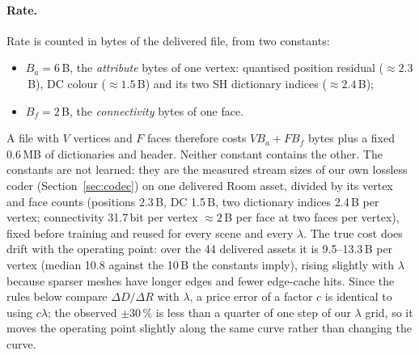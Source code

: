\documentclass[11pt,a4paper]{article}
\begin{document}
\paragraph{Rate.} Rate is counted in bytes of the delivered file, from two constants:
\begin{itemize}[nosep,leftmargin=*]
  \item $B_a = 6$\,B, the \emph{attribute} bytes of one vertex: quantised position residual ($\approx 2.3$\,B), DC colour ($\approx 1.5$\,B) and its two SH dictionary indices ($\approx 2.4$\,B);
  \item $B_f = 2$\,B, the \emph{connectivity} bytes of one face.
\end{itemize}
A file with $V$ vertices and $F$ faces therefore costs $V B_a + F B_f$ bytes plus a fixed 0.6\,MB of dictionaries and header. Neither constant contains the other. The constants are not learned: they are the measured stream sizes of our own lossless coder (Section~\ref{sec:codec}) on one delivered Room asset, divided by its vertex and face counts (positions 2.3\,B, DC 1.5\,B, two dictionary indices 2.4\,B per vertex; connectivity 31.7\,bit per vertex $\approx 2$\,B per face at two faces per vertex), fixed before training and reused for every scene and every $\lambda$. The true cost does drift with the operating point: over the 44 delivered assets it is 9.5--13.3\,B per vertex (median 10.8 against the 10\,B the constants imply), rising slightly with $\lambda$ because sparser meshes have longer edges and fewer edge-cache hits. Since the rules below compare $\Delta D / \Delta R$ with $\lambda$, a price error of a factor $c$ is identical to using $c\lambda$; the observed $\pm 30\,\%$ is less than a quarter of one step of our $\lambda$ grid, so it moves the operating point slightly along the same curve rather than changing the curve.
\end{document}
